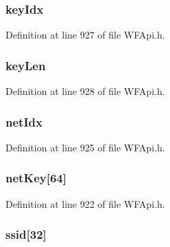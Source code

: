 \subsubsection[{key\+Idx}]{ key\+Idx}\label{structt_w_f_wps_cred_ac9a3449850cd1bfbfdd89840686f2313}


Definition at line 927 of file W\+F\+Api.\+h.

\hypertarget{structt_w_f_wps_cred_a19c67de3f96782516f1c496a77e01074}{}
\subsubsection[{key\+Len}]{ key\+Len}\label{structt_w_f_wps_cred_a19c67de3f96782516f1c496a77e01074}


Definition at line 928 of file W\+F\+Api.\+h.

\hypertarget{structt_w_f_wps_cred_ab819ac6d3a28ec5cd8f7c63e22dbe4bd}{}
\subsubsection[{net\+Idx}]{ net\+Idx}\label{structt_w_f_wps_cred_ab819ac6d3a28ec5cd8f7c63e22dbe4bd}


Definition at line 925 of file W\+F\+Api.\+h.

\hypertarget{structt_w_f_wps_cred_a29f2efaae924db63c1099fe81e233374}{}
\subsubsection[{net\+Key}]{ net\+Key\mbox{[}64\mbox{]}}\label{structt_w_f_wps_cred_a29f2efaae924db63c1099fe81e233374}


Definition at line 922 of file W\+F\+Api.\+h.

\hypertarget{structt_w_f_wps_cred_ad631765096072d8ec9f442288d4280d0}{}
\subsubsection[{ssid}]{ ssid\mbox{[}32\mbox{]}}\label{structt_w_f_wps_cred_ad631765096072d8ec9f442288d4280d0}


